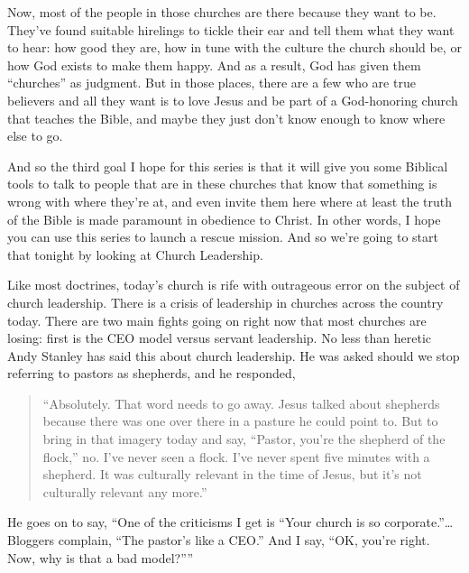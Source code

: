 \documentclass[letterpaper, 12pt]{article}
\begin{document}
    Now, most of the people in those churches are there because they
    want to be. They've found suitable hirelings to tickle their ear and
    tell them what they want to hear: how good they are, how in tune
    with the culture the church should be, or how God exists to make
    them happy. And as a result, God has given them ``churches'' as
    judgment. But in those places, there are a few who are true
    believers and all they want is to love Jesus and be part of a
    God-honoring church that teaches the Bible, and maybe they just
    don't know enough to know where else to go.

    And so the third goal I hope for this series is that it will give
    you some Biblical tools to talk to people that are in these churches
    that know that something is wrong with where they're at, and even
    invite them here where at least the truth of the Bible is made
    paramount in obedience to Christ. In other words, I hope you can use
    this series to launch a rescue mission. And so we're going to start
    that tonight by looking at Church Leadership.
    
    Like most doctrines, today's church is rife with outrageous error on
    the subject of church leadership. There is a crisis of leadership in
    churches across the country today. There are two main fights going
    on right now that most churches are losing: first is the CEO model
    versus servant leadership. No less than heretic Andy Stanley has
    said this about church leadership. He was asked should we stop
    referring to pastors as shepherds, and he responded, 

    \begin{quote}

            ``Absolutely.  That word needs to go away. Jesus talked
            about shepherds because there was one over there in a
            pasture he could point to. But to bring in that imagery
            today and say, ``Pastor, you’re the shepherd of the flock,''
            no. I've never seen a flock. I've never spent five minutes
            with a shepherd. It was culturally relevant in the time of
            Jesus, but it's not culturally relevant any more.'' 

    \end{quote}

    He goes on to say, ``One of the criticisms I get is ``Your church is
    so corporate.''\ldots Bloggers complain, ``The pastor's like a
    CEO.'' And I say, ``OK, you’re right.  Now, why is that a bad
    model?''''
\end{document}
